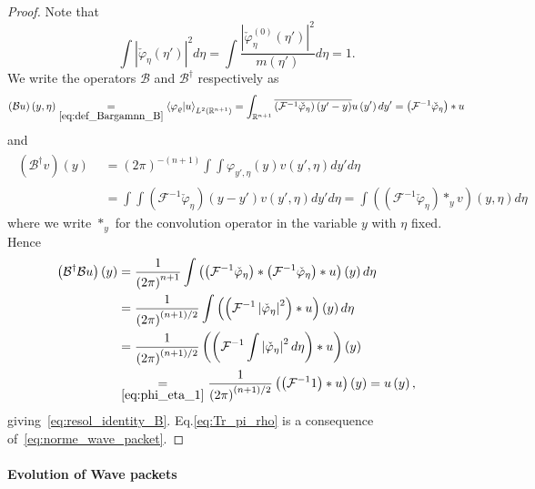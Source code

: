 \documentclass[AHL,Unicode,longabstracts,published]{cedram}
\newcommand{\clF}{\mathcal{F}}
\newcommand{\clB}{\mathcal{B}}
\newcommand{\bbR}{\mathbb{R}}
\newcommand{\bbR}{\mathbb{R}}
\begin{document}
\begin{proof}
Note that
\begin{equation}\label{eq:phi_eta_1}
\int\left|\check{\varphi}_{\eta}\left(\eta'\right)\right|^{2}d\eta=\int\frac{\left|\check{\varphi}_{\eta}^{\left(0\right)}\left(\eta'\right)\right|^{2}}{m\left(\eta'\right)}d\eta=1.
\end{equation}
We write the operators $\clB$ and $\clB^{\dagger}$ respectively as
\[
\left(\clB u\right)\left(y,\eta\right)\underset{\eqref{eq:def_Bargamnn_B}}{=}\left\langle \varphi_{\varrho}|u\right\rangle _{L^{2}\left(\bbR^{n+1}\right)}=\int_{\bbR^{n+1}}\overline{\left(\clF^{-1}\check{\varphi}_{\eta}\right)\left(y'-y\right)}u\left(y'\right)dy'=\left(\clF^{-1}\check{\varphi}_{\eta}\right)\ast u
\]
and
\begin{align*}
\begin{aligned}\left(\clB^{\dagger}v\right)\left(y\right)
\end{aligned}
& =\left(2\pi\right)^{-(n+1)}\int\int\varphi_{y',\eta}\left(y\right)v\left(y',\eta\right)dy'd\eta\\
& =\int\int\left(\clF^{-1}\check{\varphi}_{\eta}\right)\left(y-y'\right)v\left(y',\eta\right)dy'd\eta=\int\left(\left(\clF^{-1}\check{\varphi}_{\eta}\right)\ast_{y}v\right)\left(y,\eta\right)d\eta
\end{align*}
where we write $\ast_{y}$ for the convolution operator in the variable $y$ with $\eta$ fixed. Hence
\begin{align*}
\left(\clB^{\dagger}\clB u\right)\left(y\right) & = \frac{1}{\left(2\pi\right)^{n+1}}\int\left(\left(\clF^{-1}\check{\varphi}_{\eta}\right)\ast\left(\clF^{-1}\check{\varphi}_{\eta}\right)\ast u\right)\left(y\right)d\eta\\
& = \frac{1}{\left(2\pi\right)^{\left(n+1\right)/2}}\int\left(\left(\clF^{-1}\left|\check{\varphi}_{\eta}\right|^{2}\right)\ast u\right)\left(y\right)d\eta\\
& = \frac{1}{\left(2\pi\right)^{\left(n+1\right)/2}}\left(\left(\clF^{-1}\int\left|\check{\varphi}_{\eta}\right|^{2}d\eta\right)\ast u\right)\left(y\right)\\
& \underset{\eqref{eq:phi_eta_1}}{=} \frac{1}{\left(2\pi\right)^{\left(n+1\right)/2}}\left(\left(\clF^{-1}1\right)\ast u\right)\left(y\right)=u\left(y\right),
\end{align*}
giving~\eqref{eq:resol_identity_B}. Eq.\eqref{eq:Tr_pi_rho} is a consequence of~\eqref{eq:norme_wave_packet}.
\end{proof}

\paragraph{Evolution of Wave packets}
\end{document}
